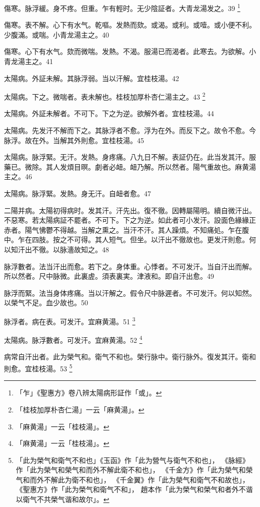傷寒。脉浮緩。身不疼。但重。乍有輕时。无少陰証者。大青龙湯发之。39
	\footnote{
		「乍」《聖惠方》卷八辨太陽病形証作「或」。
	}

傷寒。表不解。心下有水气。乾嘔。发熱而欬。或渴。或利。或噎。或小便不利。少腹滿。或喘。小青龙湯主之。40

傷寒。心下有水气。欬而微喘。发熱。不渴。服湯已而渴者。此寒去。为欲解。小青龙湯主之。41

太陽病。外証未解。其脉浮弱。当以汗解。宜桂枝湯。42

太陽病。下之。微喘者。表未解也。桂枝{\khaaitp 加厚朴杏仁}湯主之。43
	\footnote{
		「桂枝加厚朴杏仁湯」一云「麻黄湯」。
	}

太陽病。外証未解者。不可下。下之为逆。欲解外者。宜桂枝湯。44

太陽病。先发汗不解而下之。其脉浮者不愈。浮为在外。而反下之。故令不愈。今脉浮。故在外。当解其外則愈。宜桂枝湯。45

太陽病。脉浮緊。无汗。发熱。身疼痛。八九日不解。表証仍在。此当发其汗。服藥已。微除。其人发煩目暝。劇者必衄。衄乃解。所以然者。陽气重故也。麻黄湯主之。46

太陽病。脉浮緊。发熱。身无汗。自衄者愈。47

二陽并病。太陽初得病时。发其汗。汗先出{\khaaitp 。復}不徹。因轉屬陽明。續自微汗出。不惡寒。若太陽病証不罷者。不可下。下之为逆。如此者可小发汗。設面色緣緣正赤者。陽气怫鬱不得越。当解之熏之。当汗不汗。其人躁煩。不知痛処。乍在腹中。乍在四肢。按之不可得。其人短气。但坐。以汗出不徹故也。更发汗則愈。何以知汗出不徹。以脉濇故知之。48

脉浮數者。法当汗出而愈。若下之。身体重。心悸者。不可发汗。当自汗出而解。所以然者。尺中脉微。此裏虗。須表裏実。津液和。即自汗出愈。49

脉浮而緊。法当身体疼痛。当以汗解之。假令尺中脉遲者。不可发汗。何以知然。以榮气不足。血少故也。50

脉浮者。病在表。可发汗。宜麻黄湯。51
	\footnote{
		「麻黄湯」一云「桂枝湯」。
	}

{\khaaitp 太陽病。}脉浮數者。可发汗。宜麻黄湯。52
	\footnote{
		「麻黄湯」一云「桂枝湯」。
	}

病常自汗出者。此为榮气和。衛气不和也。榮行脉中。衛行脉外。復发其汗。衛和則愈。宜桂枝湯。53
	\footnote{
		「此为榮气和衛气不和也」《玉函》作「此为營气与衛气不和也」，
		《脉經》作「此为榮气和榮气和而外不解此衛不和也」，
		《千金方》作「此为榮气和榮气和而外不解此为衛不和也」，
		《千金翼》作「此为榮气和衛气不和故也」，
		《聖惠方》作「此为榮气和衛气不和」，
		趙本作「此为榮气和榮气和者外不谐以衛气不共榮气谐和故尔」。
	}

